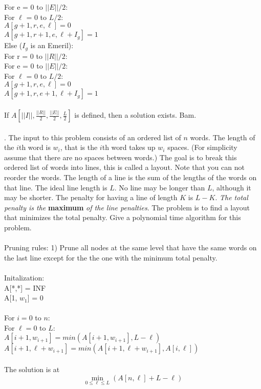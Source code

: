 \documentclass[10pt]{article}
\newcommand{\tab}{\hspace*{2em}}
\newcommand{\tabb}{\hspace*{4em}}
\newcommand{\tabbb}{\hspace*{6em}}
\newcommand{\tabbbb}{\hspace*{8em}}
\newcommand{\tabbbbb}{\hspace*{10em}}
\newcommand{\norm}[1]{\left|\left|#1\right|\right|}
\begin{document}
			\tabbb For e = 0 to $\norm{E}/2$:\\
			\tabbbb For $\ell$ = 0 to $L/2$:\\
			\tabbbbb $A[g+1,r,e,\ell] = 0$\\
			\tabbbbb $A[g+1,r+1,e,\ell+I_{g}] = 1$\\
			\tab Else ($I_{g}$ is an Emeril):\\
			\tabb For r = 0 to $\norm{R}/2$:\\
			\tabbb For e = 0 to $\norm{E}/2$:\\
			\tabbbb For $\ell$ = 0 to $L/2$:\\
			\tabbbbb $A[g+1,r,e,\ell] = 0$\\
			\tabbbbb $A[g+1,r,e+1,\ell+I_{g}] = 1$\\
			\\
			If $A[\norm{I},\frac{\norm{R}}{2},\frac{\norm{E}}{2},\frac{L}{2}]$ is defined, then a solution exists. Bam.\\
			\\
			\newpage
			.	The input to this problem consists of an ordered list of $n$ words. The length of the $i$th word is $w_i$, that
			is the $i$th word takes up $w_i$ spaces.  (For simplicity assume that there are no spaces between words.)
			The goal is to break this ordered list of words into lines, this is called a layout. Note that you can not
			reorder the words.  The length of a line is the sum of the lengths of the words on that line. The ideal
			line length is $L$. No line may be longer than $L$, although it may be shorter.  The penalty for having a
			line of length $K$ is $L - K$. \textit{The total penalty is the} \textbf{maximum} \textit{of the line penalties}. The problem is to
			find a layout that minimizes the total penalty. Give a polynomial time algorithm for this problem.\\
			\\
			Pruning rules: 
			1) Prune all nodes at the same level that have the same words on the last line except for the the one with the minimum total penalty.\\
			\\
			Initalization:\\
			A[*,*] = INF\\
			A[1, $w_1$] = 0\\
			\\
			For $i = 0$ to $n$:\\
			\tab For $\ell = 0$ to $L$:\\
			\tabb $A[i+1, w_{i+1}] = min(A[i+1, w_{i+1}], L - \ell)$\\
			\tabb $A[i+1, \ell + w_{i+1}] = min(A[i+1, \ell + w_{i+1}], A[i,\ell])$\\
			\\
			The solution is at \[\min_{0 \leq \ell \leq L}(A[n,\ell] + L - \ell)\]
\end{document}
